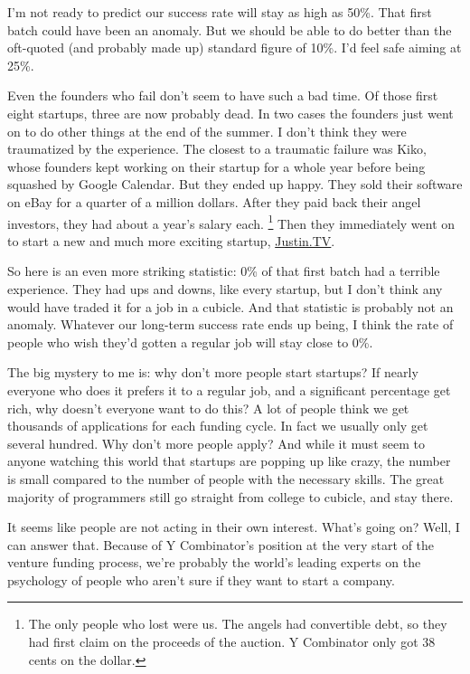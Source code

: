 \documentclass[12pt]{book}
\begin{document}
I'm not ready to predict our success rate will stay as high as 50\%.
That first batch could have been an anomaly. But we should be able to do
better than the oft-quoted (and probably made up) standard figure of
10\%. I'd feel safe aiming at 25\%.

Even the founders who fail don't seem to have such a bad time. Of those
first eight startups, three are now probably dead. In two cases the
founders just went on to do other things at the end of the summer. I
don't think they were traumatized by the experience. The closest to a
traumatic failure was Kiko, whose founders kept working on their startup
for a whole year before being squashed by Google Calendar. But they
ended up happy. They sold their software on eBay for a quarter of a
million dollars. After they paid back their angel investors, they had
about a year's salary each. \footnote{The only people who lost were us. The angels had convertible
debt, so they had first claim on the proceeds of the auction. Y
Combinator only got 38 cents on the dollar.} Then they
immediately went on to start a new and much more exciting startup,
\href{http://justin.tv}{Justin.TV}.

So here is an even more striking statistic: 0\% of that first batch had
a terrible experience. They had ups and downs, like every startup, but I
don't think any would have traded it for a job in a cubicle. And that
statistic is probably not an anomaly. Whatever our long-term success
rate ends up being, I think the rate of people who wish they'd gotten a
regular job will stay close to 0\%.

The big mystery to me is: why don't more people start startups? If
nearly everyone who does it prefers it to a regular job, and a
significant percentage get rich, why doesn't everyone want to do this? A
lot of people think we get thousands of applications for each funding
cycle. In fact we usually only get several hundred. Why don't more
people apply? And while it must seem to anyone watching this world that
startups are popping up like crazy, the number is small compared to the
number of people with the necessary skills. The great majority of
programmers still go straight from college to cubicle, and stay there.

It seems like people are not acting in their own interest. What's going
on? Well, I can answer that. Because of Y Combinator's position at the
very start of the venture funding process, we're probably the world's
leading experts on the psychology of people who aren't sure if they want
to start a company.
\end{document}
